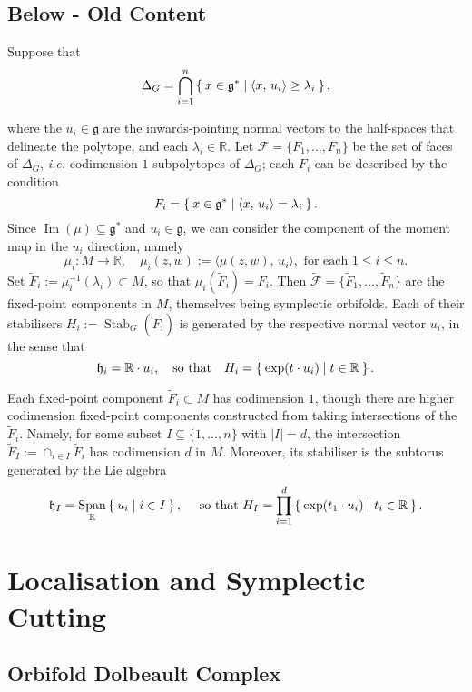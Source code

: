 \documentclass{amsart}
\newcommand{\ie}{\emph{i.e.} }
\newcommand{\ra}{\rightarrow}
\newcommand{\RR}{\mathbb{R}}
\newcommand{\mcF}{\mathcal{F}}
\newcommand{\mfg}{\mathfrak{g}}
\newcommand{\mfh}{\mathfrak{h}}
\DeclareMathOperator{\Image}{Im}
\DeclareMathOperator{\Span}{Span}
\DeclareMathOperator{\Stab}{Stab}
\begin{document}
   \subsection{Below - Old Content} 
    
	Suppose that
	\[
		\Delta_{G} = \bigcap_{i=1}^{n} \Set{x \in \mfg^{\ast} | \langle x,\, u_{i} \rangle \geq \lambda_{i} },
	\]

    where the $u_{i} \in \mfg$ are the inwards-pointing normal vectors to the half-spaces that delineate the polytope, and each $\lambda_{i} \in \mathbb{R}$. Let $\mcF = \{ F_{1}, \ldots, F_{n}\}$ be the set of faces of $\Delta_{G}$, \ie codimension $1$ subpolytopes of $\Delta_{G}$; each $F_{i}$ can be described by the condition
    \[
        F_{i} = \Set{ x \in \mfg^{\ast} | \langle x,\, u_{i} \rangle = \lambda_{i} }.
    \]
    Since $\Image(\mu) \subseteq \mfg^{\ast}$ and $u_{i} \in \mfg$, we can consider the component of the moment map in the $u_{i}$ direction, namely
    \[
        \mu_{i} : M \ra \RR, \quad \mu_{i}(z,w) := \langle \mu(z,w),\, u_{i} \rangle, \text{ for each } 1 \leq i \leq n.
    \]
    Set $\tilde{F}_{i} := \mu_{i}^{-1}(\lambda_{i}) \subset M$, so that $\mu_{i}(\tilde{F}_{i}) = F_{i}$. Then $\tilde{\mcF} = \{\tilde{F}_{1}, \ldots, \tilde{F}_{n}\}$ are the fixed-point components in $M$, themselves being symplectic orbifolds. Each of their stabilisers $H_{i} := \Stab_{G}(\tilde{F}_{i})$ is generated by the respective normal vector $u_{i}$, in the sense that
    \[
    	\mfh_{i} = \RR\cdot u_{i}, \quad \text{so that} \quad H_{i} = \Set{\exp(t\cdot u_{i}) | t \in \RR}.
    \]
    
    Each fixed-point component $\tilde{F}_{i} \subset M$ has codimension $1$, though there are higher codimension fixed-point components constructed from taking intersections of the $\tilde{F}_{i}$. Namely, for some subset $I \subseteq \{1, \ldots, n\}$ with $|I| = d$, the intersection $\tilde{F}_{I} := \cap_{i \in I} \tilde{F}_{i}$ has codimension $d$ in $M$. Moreover, its stabiliser is the subtorus generated by the Lie algebra
    \[
    	\mfh_{I} = \Span_{\RR}\Set{u_{i} | i \in I}, \quad \text{ so that } H_{I} = \prod_{i=1}^{d}\Set{\exp(t_{1}\cdot u_{i}) | t_{i} \in \RR }.
    \]
    	
	\section{Localisation and Symplectic Cutting}
	
	\subsection{Orbifold Dolbeault Complex}
	
\end{document}
